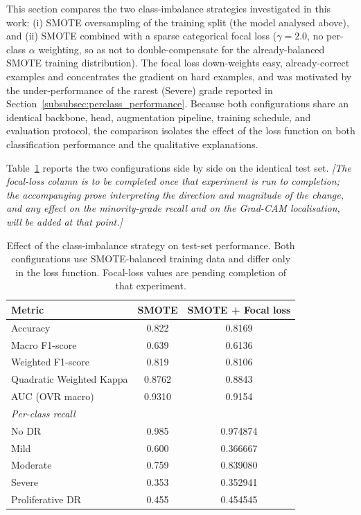 
This section compares the two class-imbalance strategies investigated in this work:
(i) SMOTE oversampling of the training split (the model analysed above), and
(ii) SMOTE combined with a sparse categorical focal loss
($\gamma = 2.0$, no per-class $\alpha$ weighting, so as not to double-compensate for
the already-balanced SMOTE training distribution). The focal loss down-weights
easy, already-correct examples and concentrates the gradient on hard examples, and
was motivated by the under-performance of the rarest (Severe) grade reported in
Section~\ref{subsubsec:perclass_performance}. Because both configurations share an
identical backbone, head, augmentation pipeline, training schedule, and evaluation
protocol, the comparison isolates the effect of the loss function on both
classification performance and the qualitative explanations.

Table~\ref{tab:imbalance_ablation} reports the two configurations side by side on
the identical test set. \emph{[The focal-loss column is to be completed once that
experiment is run to completion; the accompanying prose interpreting the direction
and magnitude of the change, and any effect on the minority-grade recall and on the
Grad-CAM localisation, will be added at that point.]}

\begin{table}[H]
\centering
\caption{Effect of the class-imbalance strategy on test-set performance. Both
configurations use SMOTE-balanced training data and differ only in the loss
function. Focal-loss values are pending completion of that experiment.}
\label{tab:imbalance_ablation}
\begin{tabular}{lcc}
\toprule
Metric & SMOTE & SMOTE + Focal loss \\
\midrule
Accuracy                  & 0.822  & 0.8169 \\
Macro F1-score            & 0.639  & 0.6136 \\
Weighted F1-score         & 0.819  & 0.8106 \\
Quadratic Weighted Kappa  & 0.8762 & 0.8843 \\
AUC (OVR macro)           & 0.9310 & 0.9154 \\
\midrule
\multicolumn{3}{l}{\emph{Per-class recall}} \\
\quad No DR            & 0.985 & 0.974874 \\
\quad Mild             & 0.600 & 0.366667 \\
\quad Moderate         & 0.759 & 0.839080 \\
\quad Severe           & 0.353 & 0.352941 \\
\quad Proliferative DR & 0.455 & 0.454545 \\
\bottomrule
\end{tabular}
\end{table}

